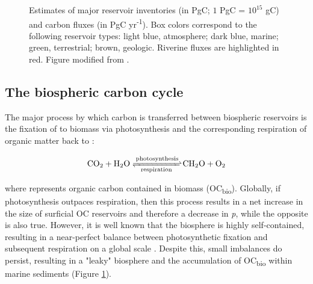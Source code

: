 \begin{figure}[h]
	\caption[Carbon cycle reservoir inventories and fluxes]{Estimates of major reservoir inventories (in PgC; $1$ PgC = $10^{15}$ gC) and carbon fluxes (in PgC yr\textsuperscript{-1}). Box colors correspond to the following reservoir types: light blue, atmosphere; dark blue, marine; green, terrestrial; brown, geologic. Riverine fluxes are highlighted in red. Figure modified from \citet{Bianchi:2011cu}.}
	\label{Ch1Fig:1}
\end{figure}

\subsection{The biospheric carbon cycle}

The major process by which carbon is transferred between biospheric reservoirs is the fixation of  to biomass via photosynthesis and the corresponding respiration of organic matter back to :

\begin{equation}\label{Ch1Eq:1}
	\ce{CO2 + H2O <=>[{photosynthesis}][{respiration}] CH2O + O2}
\end{equation}

where  represents organic carbon contained in biomass (OC\textsubscript{bio}). Globally, if photosynthesis outpaces respiration, then this process results in a net increase in the size of surficial OC reservoirs and therefore a decrease in \textit{p}, while the opposite is also true. However, it is well known that the biosphere is highly self-contained, resulting in a near-perfect balance between photosynthetic  fixation and subsequent respiration on a global scale \citep{Sarmiento:2006wz}. Despite this, small imbalances do persist, resulting in a "leaky" biosphere and the accumulation of OC\textsubscript{bio} within marine sediments (Figure \ref{Ch1Fig:1}).

